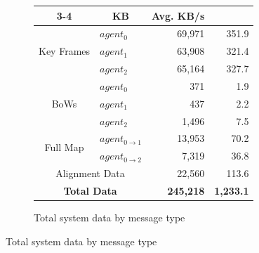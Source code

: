 \begin{figure}[h]
\begin{subfigure}[b]{0.45\linewidth}
{{                \def\arraystretch{1.2}
                \begin{tabular}{ |c|l|r|r| }
                    \cline{3-4}
                    \multicolumn{2}{}{}                       & \multicolumn{1}{|c|}{KB} & \multicolumn{1}{|c|}{Avg. KB/s}         \\
                    \hline
                    \multirow{3}{*}{Key Frames}               & $agent_0$                & 69,971                          & 351.9 \\
                                                              & $agent_1$                & 63,908                          & 321.4 \\
                                                              & $agent_2$                & 65,164                          & 327.7 \\
                    \hline
                    \multirow{3}{*}{BoWs}                     & $agent_0$                & 371                             & 1.9   \\
                                                              & $agent_1$                & 437                             & 2.2   \\
                                                              & $agent_2$                & 1,496                           & 7.5   \\
                    \hline
                    \multirow{2}{*}{Full Map}
                                                              & $agent_{0\to1}$          & 13,953                          & 70.2  \\
                                                              & $agent_{0\to2}$          & 7,319                           & 36.8  \\
                    \hline
                    \multicolumn{2}{|c|}{Alignment Data}      & 22,560                   & 113.6                                   \\
                    \hline
                    \multicolumn{2}{|c|}{\textbf{Total Data}} & \textbf{245,218}         & \textbf{1,233.1}                        \\
                    \hline
                \end{tabular}
            }
        }
        \caption{Total system data by message type}
        \vfill


\end{subfigure}
\end{figure}

